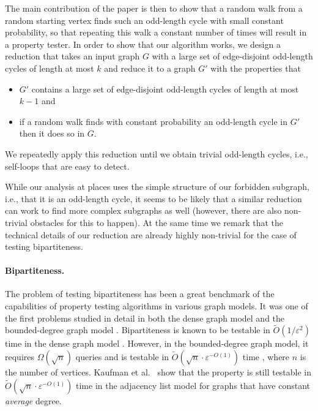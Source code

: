\documentclass[11pt]{article}
\newcommand{\eps}{\ensuremath{\epsilon}}
\def\epsilon{\ensuremath{\varepsilon}}
\begin{document}
The main contribution of the paper is then to show that a random walk from a random starting vertex finds such an odd-length cycle with small constant probability, so that repeating this walk a constant number of times will result in a property tester. In order to show that our algorithm works, we design
a reduction that takes an input graph $G$ with a large set of edge-disjoint odd-length cycles of length at most $k$ and reduce it to a graph $G'$ with the
properties that
\begin{itemize}
\item
$G'$ contains a large set of edge-disjoint odd-length cycles of length at most $k-1$ and
\item
if a random walk finds with constant probability an odd-length cycle in $G'$ then it does so in $G$.
\end{itemize}
We repeatedly apply this reduction until we obtain trivial odd-length cycles, i.e., self-loops that are easy to detect.

While our analysis at places uses the simple structure of our forbidden subgraph, i.e., that it is an odd-length cycle, it seems to be likely that a
similar reduction can work to find more complex subgraphs as well (however, there are also non-trivial obstacles for this to happen). At the same time
we remark that the technical details of our reduction are already highly non-trivial for the case of testing bipartiteness.




\paragraph{Bipartiteness.}

The problem of testing bipartiteness has been a great benchmark of the capabilities of property testing algorithms in various graph models. It was one of the first problems studied in detail in both the dense graph model \cite{GGR98} and the bounded-degree graph model \cite{GR97,GR99}. Bipartiteness is known to be testable in $\widetilde{O}(1/\eps^2)$ time in the dense graph model \cite{AK02}. However, in the bounded-degree graph model, it requires $\Omega(\sqrt{n})$ queries \cite{GR97} and is testable in $\widetilde{O}(\sqrt{n} \cdot \eps^{-O(1)})$ time \cite{GR99}, where $n$ is the number of vertices. Kaufman et al.\ \cite{KKR04} show that the property is still testable in $\widetilde{O}(\sqrt{n} \cdot \eps^{-O(1)})$ time in the adjacency list model for graphs that have constant \emph{average} degree.
\end{document}
